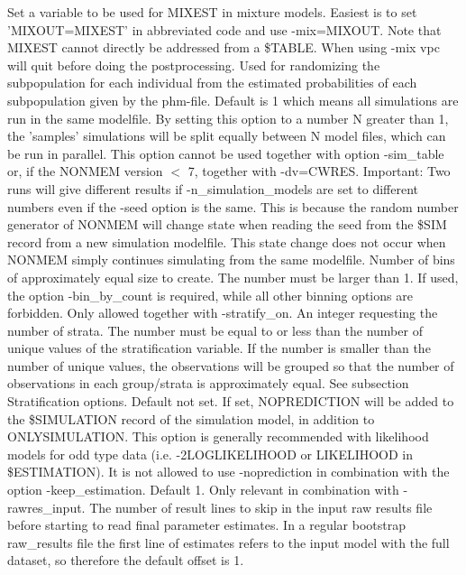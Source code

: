 \begin{optionlist}
\nextopt
{}
Set a variable to be used for MIXEST in mixture models. Easiest is to set 'MIXOUT=MIXEST' in abbreviated code and use -mix=MIXOUT. Note that MIXEST cannot directly be addressed from a \$TABLE. When using -mix vpc will quit before doing the postprocessing.
\nextopt
{}
Used for randomizing the subpopulation for each individual from the estimated probabilities of each subpopulation given by the phm-file.
\nextopt
{}
Default is 1 which means all simulations are run in the same modelfile. By setting this option to a number N greater than 1, the 'samples' simulations will be split equally between N model files, which can be run in parallel. This option cannot be used together with option \mbox{-sim\_table} or, if the NONMEM version $<$ 7, together with -dv=CWRES. Important: Two runs will give different results if -n\_simulation\_models are set to different numbers even if the -seed option is the same. This is because the random number generator of NONMEM will change state when reading the seed from the \$SIM record from a new simulation modelfile. This state change does not occur when NONMEM simply continues simulating from the same modelfile. 
\nextopt
{}
Number of bins of approximately equal size to create. The number must be larger than 1.
If used, the option -bin\_by\_count is required, while all other binning options are forbidden.
Only allowed together with -stratify\_on. An integer requesting the number of strata. The number must be equal to or less than the number 
of unique values of the stratification variable. If the number is smaller than the number of unique values, the observations will be grouped 
so that the number of observations in each group/strata is approximately equal.
See subsection Stratification options.  
\nextopt
{}
Default not set. If set, NOPREDICTION will be added to the \$SIMULATION record of the simulation model, in addition to ONLYSIMULATION. This option is generally recommended with likelihood models for odd type data (i.e. -2LOGLIKELIHOOD or LIKELIHOOD in \$ESTIMATION). It is not allowed to use -noprediction in combination with the option \mbox{-keep\_estimation}. 
\nextopt
{}
Default 1. Only relevant in combination with -rawres\_input. The number of result lines to skip in the input raw results file before starting to read final parameter estimates. In a regular bootstrap raw\_results file the first line of estimates refers to the input model with the full dataset, so therefore the default offset is 1. 

\end{optionlist}
